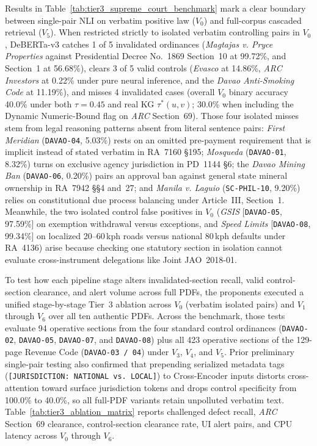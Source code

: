 Results in Table~\ref{tab:tier3_supreme_court_benchmark} mark a clear boundary between single-pair NLI on verbatim positive law ($V_0$) and full-corpus cascaded retrieval ($V_5$). When restricted strictly to isolated verbatim controlling pairs in $V_0$, DeBERTa-v3 catches 1 of 5 invalidated ordinances (\textit{Magtajas v. Pryce Properties} against Presidential Decree No.~1869 Section~10 at 99.72\%, and Section~1 at 56.68\%), clears 3 of 5 valid controls (\textit{Evasco} at 14.86\%, \textit{ARC Investors} at 0.22\% under pure neural inference, and the \textit{Davao Anti-Smoking Code} at 11.19\%), and misses 4 invalidated cases (overall $V_0$ binary accuracy 40.0\% under both $\tau = 0.45$ and real KG $\tau^*(u, v)$; 30.0\% when including the Dynamic Numeric-Bound flag on \textit{ARC} Section~69). Those four isolated misses stem from legal reasoning patterns absent from literal sentence pairs: \textit{First Meridian} (\texttt{DAVAO-04}, 5.03\%) rests on an omitted pre-payment requirement that is implicit instead of stated verbatim in RA~7160 \S195; \textit{Mosqueda} (\texttt{DAVAO-01}, 8.32\%) turns on exclusive agency jurisdiction in PD~1144 \S6; the \textit{Davao Mining Ban} (\texttt{DAVAO-06}, 0.20\%) pairs an approval ban against general state mineral ownership in RA~7942 \S\S4 and~27; and \textit{Manila v. Laguio} (\texttt{SC-PHIL-10}, 9.20\%) relies on constitutional due process balancing under Article~III, Section~1. Meanwhile, the two isolated control false positives in $V_0$ (\textit{GSIS} [\texttt{DAVAO-05}, 97.59\%] on exemption withdrawal versus exceptions, and \textit{Speed Limits} [\texttt{DAVAO-08}, 99.34\%] on localized 20--60\,kph roads versus national 80\,kph defaults under RA~4136) arise because checking one statutory section in isolation cannot evaluate cross-instrument delegations like Joint JAO~2018-01.

To test how each pipeline stage alters invalidated-section recall, valid control-section clearance, and alert volume across full PDFs, the proponents executed a unified stage-by-stage Tier~3 ablation across $V_0$ (verbatim isolated pairs) and $V_1$ through $V_6$ over all ten authentic PDFs. Across the benchmark, those tests evaluate 94 operative sections from the four standard control ordinances (\texttt{DAVAO-02}, \texttt{DAVAO-05}, \texttt{DAVAO-07}, and \texttt{DAVAO-08}) plus all 423 operative sections of the 129-page Revenue Code (\texttt{DAVAO-03 / 04}) under $V_3$, $V_4$, and $V_5$. Prior preliminary single-pair testing also confirmed that prepending serialized metadata tags (\texttt{[JURISDICTION: NATIONAL vs. LOCAL]}) to Cross-Encoder inputs distorts cross-attention toward surface jurisdiction tokens and drops control specificity from 100.0\% to 40.0\%, so all full-PDF variants retain unpolluted verbatim text. Table~\ref{tab:tier3_ablation_matrix} reports challenged defect recall, \textit{ARC} Section~69 clearance, control-section clearance rate, UI alert pairs, and CPU latency across $V_0$ through $V_6$.

